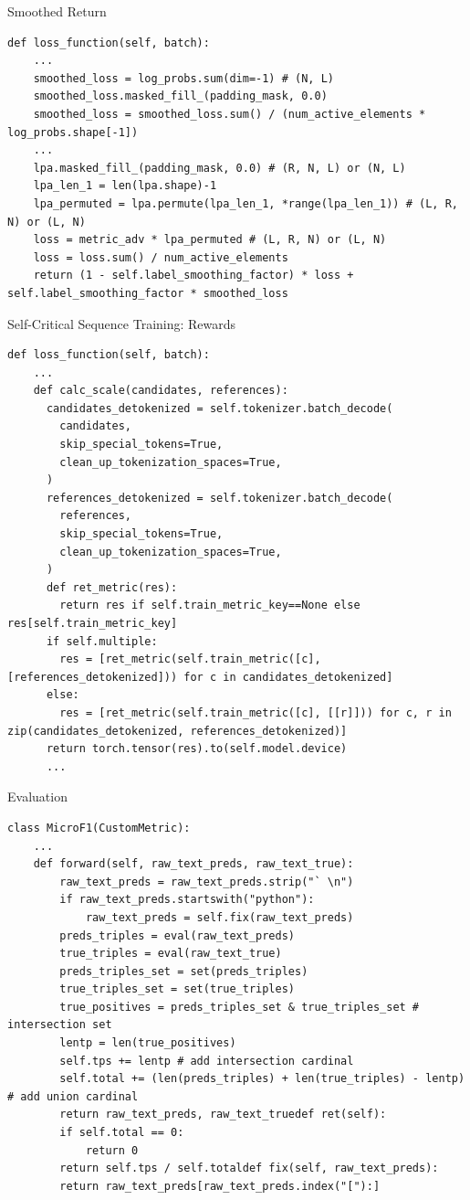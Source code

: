 \documentclass[aspectratio=169,xcolor=dvipsnames]{beamer}
\begin{document}
\begin{frame}[fragile]{Smoothed Return}
\begin{verbatim}
def loss_function(self, batch):
    ...
    smoothed_loss = log_probs.sum(dim=-1) # (N, L)
    smoothed_loss.masked_fill_(padding_mask, 0.0)
    smoothed_loss = smoothed_loss.sum() / (num_active_elements * log_probs.shape[-1])
    ...
    lpa.masked_fill_(padding_mask, 0.0) # (R, N, L) or (N, L)
    lpa_len_1 = len(lpa.shape)-1
    lpa_permuted = lpa.permute(lpa_len_1, *range(lpa_len_1)) # (L, R, N) or (L, N)
    loss = metric_adv * lpa_permuted # (L, R, N) or (L, N)
    loss = loss.sum() / num_active_elements
    return (1 - self.label_smoothing_factor) * loss + self.label_smoothing_factor * smoothed_loss
\end{verbatim}
\end{frame}
\begin{frame}[fragile]{Self-Critical Sequence Training: Rewards}
\begin{verbatim}
def loss_function(self, batch):
    ...
    def calc_scale(candidates, references):
      candidates_detokenized = self.tokenizer.batch_decode(
        candidates,
        skip_special_tokens=True,
        clean_up_tokenization_spaces=True,
      )
      references_detokenized = self.tokenizer.batch_decode(
        references,
        skip_special_tokens=True,
        clean_up_tokenization_spaces=True,
      )
      def ret_metric(res):
        return res if self.train_metric_key==None else res[self.train_metric_key]
      if self.multiple:
        res = [ret_metric(self.train_metric([c], [references_detokenized])) for c in candidates_detokenized]
      else:
        res = [ret_metric(self.train_metric([c], [[r]])) for c, r in zip(candidates_detokenized, references_detokenized)]
      return torch.tensor(res).to(self.model.device)
      ...
\end{verbatim}
\end{frame}
\begin{frame}[fragile]{Evaluation}
\begin{verbatim}
class MicroF1(CustomMetric):
    ...
    def forward(self, raw_text_preds, raw_text_true):
        raw_text_preds = raw_text_preds.strip("` \n")
        if raw_text_preds.startswith("python"):
            raw_text_preds = self.fix(raw_text_preds)
        preds_triples = eval(raw_text_preds)
        true_triples = eval(raw_text_true)
        preds_triples_set = set(preds_triples)
        true_triples_set = set(true_triples)
        true_positives = preds_triples_set & true_triples_set # intersection set
        lentp = len(true_positives)
        self.tps += lentp # add intersection cardinal
        self.total += (len(preds_triples) + len(true_triples) - lentp) # add union cardinal
        return raw_text_preds, raw_text_truedef ret(self):
        if self.total == 0:
            return 0
        return self.tps / self.totaldef fix(self, raw_text_preds):
        return raw_text_preds[raw_text_preds.index("["):]
\end{verbatim}
\end{frame}
\end{document}
